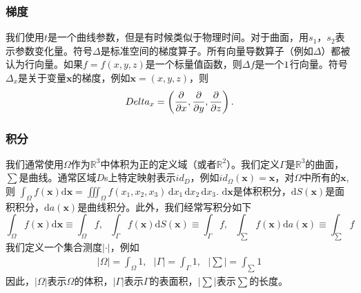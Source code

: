 \documentclass[12pt,a4paper]{article}
\numberwithin{equation}{section}
\begin{document}
\subsubsection{梯度}
我们使用$t$是一个曲线参数，但是有时候类似于物理时间。对于曲面，用$s_1$，$s_2$表示参数变化量。符号$\Delta$是标准空间的梯度算子。所有向量导数算子（例如$\Delta$）都被认为行向量。如果$f=f(x,y,z)$是一个标量值函数，则$\Delta f$是一个$1\time 3$行向量。符号$\Delta _x$是关于变量$\mathbf{x}$的梯度，例如$\mathbf{x}=(x,y,z)$，则
$$
\\Delta _x=\left( \frac{\partial}{\partial x},\frac{\partial}{\partial y} ,\frac{\partial}{\partial z} \right).
$$
\subsubsection{积分}
我们通常使用$\Omega$作为$\mathbb{R}^3$中体积为正的定义域（或者$\mathbb{R}^2$）。我们定义$\Gamma$是$\mathbb{R}^3$的曲面，$\sum$是曲线。通常区域$D$s上特定映射表示$id_D$，例如$id_{\Omega}(\mathbf{x})=\mathbf{x}$，对$\Omega$中所有的$\mathbf{x}$,则
$\int _{\Omega} f(\mathbf{x})\mathrm{d}\mathbf{x}=\iiint_{\Omega} f(x_1,x_2,x_3)\,\mathrm{d}x_1\,\mathrm{d}x_2\,\mathrm{d}x_3.$
$\mathrm{d}\mathbf{x}$是体积积分，$\mathrm{d}S(\mathbf{x})$是面积积分，$\mathrm{d}a(\mathbf{x})$是曲线积分。此外，我们经常写积分如下
$$
\int _{\Omega} f(\mathbf{x})\mathrm{d}\mathbf{x} \equiv \int _{\Omega} f,~~~\int _{\Gamma} f(\mathbf{x})\mathrm{d}S(\mathbf{x}) \equiv \int _{\Gamma} f,~~~\int _{\sum} f(\mathbf{x})\mathrm{d}a(\mathbf{x}) \equiv \int _{\sum} f
$$
我们定义一个集合测度$|\cdot|$，例如
\begin{gather}
|\Omega|=\int _{\Omega}1,~~~|\Gamma|=\int _{\Gamma}1,~~~|\sum|=\int _{\sum}1
\end{gather}
因此，$|\Omega|$表示$\Omega$的体积，$|\Gamma|$表示$\Gamma$的表面积，$|\sum|$表示$\sum$的长度。








\cite{tam19912d}
%
\end{document}
